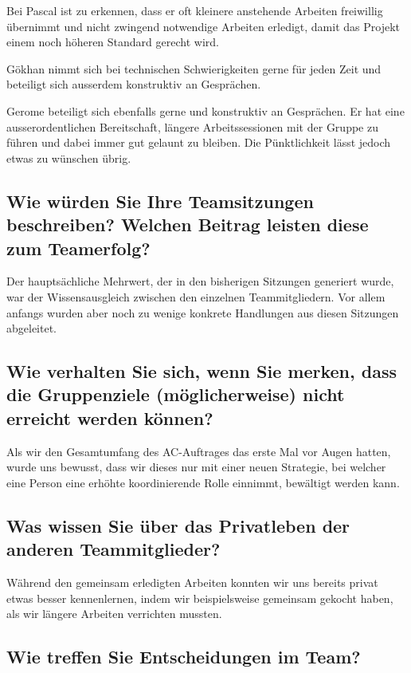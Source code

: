 Bei Pascal ist zu erkennen, dass er oft kleinere anstehende Arbeiten freiwillig übernimmt und nicht zwingend notwendige Arbeiten erledigt, damit das Projekt einem noch höheren Standard gerecht wird. 

Gökhan nimmt sich bei technischen Schwierigkeiten gerne für jeden Zeit und beteiligt sich ausserdem konstruktiv an Gesprächen.  

Gerome beteiligt sich ebenfalls gerne und konstruktiv an Gesprächen. Er hat eine ausserordentlichen Bereitschaft, längere Arbeitssessionen mit der Gruppe zu führen und dabei immer gut gelaunt zu bleiben. Die Pünktlichkeit lässt jedoch etwas zu wünschen übrig.  

\subsection*{Wie würden Sie Ihre Teamsitzungen beschreiben? Welchen Beitrag leisten diese zum
Teamerfolg?}

Der hauptsächliche Mehrwert, der in den bisherigen Sitzungen generiert wurde, war der Wissensausgleich zwischen den einzelnen Teammitgliedern. Vor allem anfangs wurden aber noch zu wenige konkrete Handlungen aus diesen Sitzungen abgeleitet. 

\subsection*{Wie verhalten Sie sich, wenn Sie merken, dass die Gruppenziele (möglicherweise)
nicht erreicht werden können?}

Als wir den Gesamtumfang des AC-Auftrages das erste Mal vor Augen hatten, wurde uns bewusst, dass wir dieses nur mit einer neuen Strategie, bei welcher eine Person eine erhöhte koordinierende Rolle einnimmt, bewältigt werden kann. 

\subsection*{Was wissen Sie über das Privatleben der anderen Teammitglieder?}

Während den gemeinsam erledigten Arbeiten konnten wir uns bereits privat etwas besser kennenlernen, indem wir beispielsweise gemeinsam gekocht haben, als wir längere Arbeiten verrichten mussten. 

\subsection*{Wie treffen Sie Entscheidungen im Team?}

